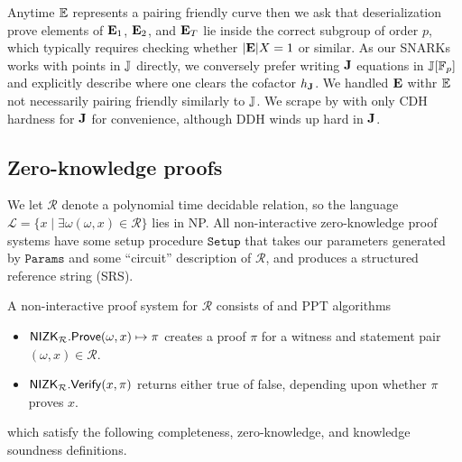 Anytime ${\mathbb{E}}$ represents a pairing friendly curve then we ask that
deserialization prove elements of ${\mathbf{E}}_1$, ${\mathbf{E}}_2$, and ${\mathbf{E}}_T$
lie inside the correct subgroup of order $p$,
 which typically requires checking whether $|{\mathbf{E}}| X = 1$ or similar.
As our SNARKs works with points in ${\mathbb{J}}$ directly, we conversely
prefer writing ${\mathbf{J}}$ equations in ${\mathbb{J}}[\mathbb{F}_p]$ and explicitly describe
where one clears the cofactor $h_{{\mathbf{J}}}$.  We handled ${\mathbf{E}}$ withr
${\mathbb{E}}$ not necessarily pairing friendly similarly to ${\mathbb{J}}$.
We scrape by with only CDH hardness for ${\mathbf{J}}$ for convenience,
although DDH winds up hard in ${\mathbf{J}}$.


\subsection{Zero-knowledge proofs}

\newcommand\rel{\ensuremath{\mathcal{R}}\xspace}
\newcommand\lang{\ensuremath{\mathcal{L}}\xspace}

% 

We let \rel denote a polynomial time decidable relation, so the language
 $\lang = \{x \mid \exists \omega (\omega,x) \in \rel \}$ lies in NP.
All non-interactive zero-knowledge proof systems have some setup procedure $\mathtt{Setup}$ that takes our parameters generated by $\mathtt{Params}$ and some ``circuit'' description of \rel, and produces a structured reference string (SRS).

A non-interactive proof system for $\rel$ consists of \Prove and \Verify PPT algorithms
\begin{itemize}
\item $\NIZK_\rel.\Prove(\omega, x) \mapsto \pi$ creates a proof $\pi$ for a witness and statement pair $(\omega,x) \in \rel$.
\item $\NIZK_\rel.\Verify(x, \pi)$ returns either true of false, depending upon whether $\pi$  proves $x$.
\end{itemize}	
which satisfy the following completeness, zero-knowledge, and knowledge soundness definitions.

